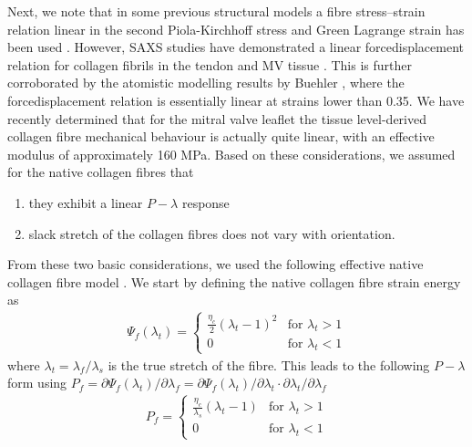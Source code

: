     
    Next, we note that in some previous structural models a fibre stress–strain relation linear in the second Piola-Kirchhoff stress and Green Lagrange strain has been used \cite{sacks_incorporation_2003,fan_simulation_2014,lanir_structural_1979}. However, SAXS studies have demonstrated a linear force\Hyphdash displacement relation for collagen fibrils in the tendon \cite{sasaki_elongation_1996,sasaki_stress_1996} and MV tissue \cite{liao_relation_2007}. This is further corroborated by the atomistic modelling results by Buehler \cite{buehler_atomistic_2006}, where the force\Hyphdash displacement relation is essentially linear at strains lower than 0.35. We have recently determined that for the mitral valve leaflet the tissue level-derived collagen fibre mechanical behaviour is actually quite linear, with an effective modulus of approximately 160 MPa. Based on these considerations, we assumed for the native collagen fibres that
        \begin{enumerate}
            \item they exhibit a linear $P-\lambda$ response
            \item slack stretch of the collagen fibres does not vary with orientation.
        \end{enumerate}
    From these two basic considerations, we used the following effective native collagen fibre model \cite{fata_insights_2014,fan_simulation_2014}. We start by defining the native collagen fibre strain energy as
        \begin{equation}\label{c3:eqn:21}
        \begin{aligned}
        \Psi_f(\lambda_t) = 
            \begin{cases} 
                \frac{\eta_c}{2} \left(\lambda_t -1\right)^2 & \text{for } \lambda_t >1\\
                0 & \text{for } \lambda_t < 1  
            \end{cases}
        \end{aligned}
        \end{equation}
    where $\lambda_t = \lambda_f/\lambda_s$ is the true stretch of the fibre. This leads to the following $P-\lambda$ form using $P_f = \partial \Psi_f(\lambda_t)/\partial \lambda_f = \partial \Psi_f(\lambda_t)/\partial \lambda_t \cdot \partial \lambda_t/\partial \lambda_f$
        \begin{equation}\label{c3:eqn:22}
        \begin{aligned}
        P_f = 
            \begin{cases} 
                \frac{\eta_c}{\lambda_s} \left(\lambda_t -1\right) & \text{for } \lambda_t >1\\
                0 & \text{for } \lambda_t < 1  
            \end{cases}
        \end{aligned}
        \end{equation}
